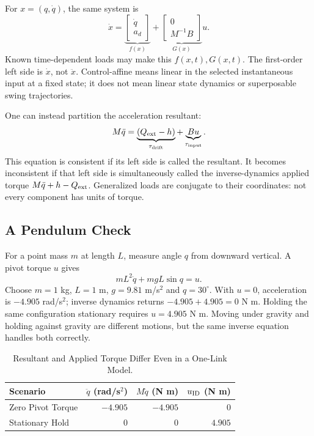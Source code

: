 \documentclass[11pt,a4paper]{article}
\begin{document}
For $x=(q,\dot q)$, the same system is
\begin{equation}
\dot x=\underbrace{\begin{bmatrix}\dot q\\a_d\end{bmatrix}}_{f(x)}+
\underbrace{\begin{bmatrix}0\\M^{-1}B\end{bmatrix}}_{G(x)}u.
\label{eq:control_affine}
\end{equation}
Known time-dependent loads may make this $f(x,t),G(x,t)$. The first-order left side is $\dot x$, not $\ddot x$. Control-affine means linear in the selected instantaneous input at a fixed state; it does not mean linear state dynamics or superposable swing trajectories.

One can instead partition the acceleration resultant:
\begin{equation}
M\ddot q=\underbrace{(Q_{\rm ext}-h)}_{\tau_{\rm drift}}
+\underbrace{Bu}_{\tau_{\rm input}}.
\end{equation}
This equation is consistent if its left side is called the resultant. It becomes inconsistent if that left side is simultaneously called the inverse-dynamics applied torque $M\ddot q+h-Q_{\rm ext}$. Generalized loads are conjugate to their coordinates: not every component has units of torque.

\subsection{A Pendulum Check}
For a point mass $m$ at length $L$, measure angle $q$ from downward vertical. A pivot torque $u$ gives
\begin{equation}
mL^2\ddot q+mgL\sin q=u.
\end{equation}
Choose $m=1$ kg, $L=1$ m, $g=9.81$ m/s$^2$ and $q=30^\circ$. With $u=0$, acceleration is $-4.905$ rad/s$^2$; inverse dynamics returns
$-4.905+4.905=0$ N m. Holding the same configuration stationary requires $u=4.905$ N m. Moving under gravity and holding against gravity are different motions, but the same inverse equation handles both correctly.

\begin{table}[htbp]\centering
\begin{tabular}{lrrr}\toprule
Scenario & $\ddot q$ (rad/s$^2$) & $M\ddot q$ (N m) & $u_{\rm ID}$ (N m)\\\midrule
Zero Pivot Torque & $-4.905$ & $-4.905$ & $0$\\
Stationary Hold & $0$ & $0$ & $4.905$\\\bottomrule
\end{tabular}
\caption{Resultant and Applied Torque Differ Even in a One-Link Model.}
\end{table}
\end{document}
